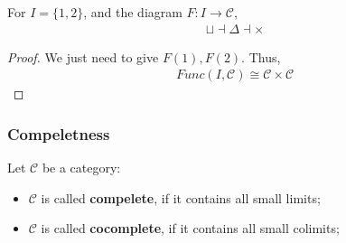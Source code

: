 \documentclass[Total.tex]{subfiles}
\begin{document}
				\begin{corollary}
					For $I=\{1,2\}$, and the diagram $F:I\rightarrow \mathcal{C}$,
					\begin{gather*}
						\sqcup \dashv \Delta\dashv \times
					\end{gather*}
				\end{corollary}
				\begin{proof}
					We just need to give $F(1),F(2)$. Thus,
					\begin{gather*}
						Func(I,\mathcal{C})\cong \mathcal{C}\times \mathcal{C}
					\end{gather*}
				\end{proof}
				
				\subsubsection{Compeletness}
				
				\begin{Def} Let $\mathcal{C}$ be a category:
					\begin{itemize}
						\item $\mathcal{C}$ is called \textbf{compelete}, if it contains all small limits;
						\item $\mathcal{C}$ is called \textbf{cocomplete}, if it contains all small colimits;
					\end{itemize}
				\end{Def}
				
\end{document}
